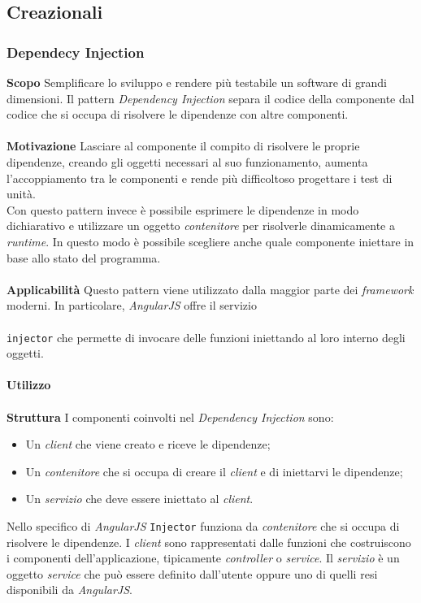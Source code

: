 \subsection{Creazionali}
\subsubsection{Dependecy Injection}
\textbf{Scopo}	Semplificare lo sviluppo e rendere più testabile un software di grandi dimensioni. Il pattern \textit{Dependency Injection} separa il codice della componente dal codice che si occupa di risolvere le dipendenze con altre componenti.
\\\\
\textbf{Motivazione}	Lasciare al componente il compito di risolvere le proprie dipendenze, creando gli oggetti necessari al suo funzionamento, aumenta l'accoppiamento tra le componenti e rende più difficoltoso progettare i test di unità.
\\ Con questo pattern invece è possibile esprimere le dipendenze in modo dichiarativo e utilizzare un oggetto \textit{contenitore} per risolverle dinamicamente a \textit{runtime}. In questo modo è possibile scegliere anche quale componente iniettare in base allo stato del programma.
\\\\
\textbf{Applicabilità}	Questo pattern viene utilizzato dalla maggior parte dei \textit{framework} moderni. In particolare, \textit{AngularJS} offre il servizio
\\\\
\texttt{injector} che permette di invocare delle funzioni iniettando al loro interno degli oggetti.
\\\\
\textbf{Utilizzo}
\\\\
\textbf{Struttura}	I componenti coinvolti nel \textit{Dependency Injection} sono:
	\begin{itemize}
		\item Un \textit{client} che viene creato e riceve le dipendenze;
		\item Un \textit{contenitore} che si occupa di creare il \textit{client} e di iniettarvi le dipendenze;
		\item Un \textit{servizio} che deve essere iniettato al \textit{client}.
	\end{itemize}
Nello specifico di \textit{AngularJS} \texttt{Injector} funziona da \textit{contenitore} che si occupa di risolvere le dipendenze. I \textit{client} sono rappresentati dalle funzioni che costruiscono i componenti dell'applicazione, tipicamente \textit{controller} o \textit{service}. Il \textit{servizio} è un oggetto \textit{service} che può essere definito dall'utente oppure uno di quelli resi disponibili da \textit{AngularJS}.
